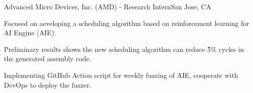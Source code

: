 \renewcommand{\timeInterval}{\DTMdisplaydate{2023}{7}{17}{-1} - \present}

\ifx\lang\eng
	\begin{rSubsection}{Advanced Micro Devices, Inc. (AMD)}{\timeInterval}{Research Intern}{San Jose, CA}
		\item Focused on aeveloping a scheduling algorithm based on reinforcement learning for AI Engine (AIE).
		\item Preliminary results shows the new scheduling algorithm can reduce \~5\% cycles in the generated assembly code.
		\item Implementing GitHub Action script for weekly fuzzing of AIE, cooperate with DevOps to deploy the fuzzer.
	\end{rSubsection}
\else
\fi

\renewcommand{\timeInterval}{}